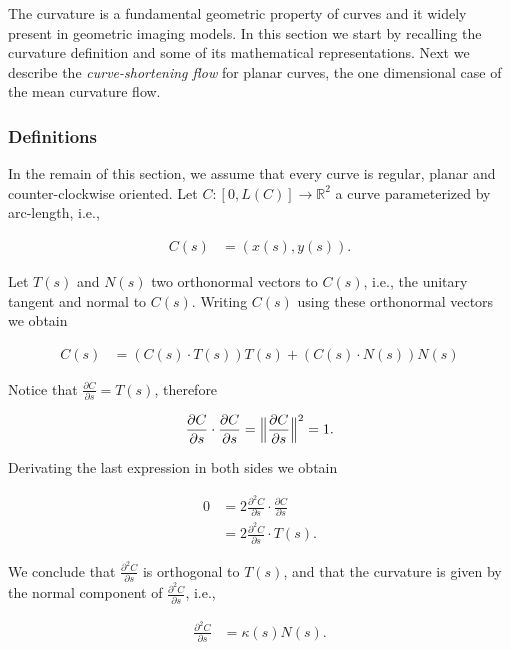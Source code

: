 The curvature is a fundamental geometric property of curves and it widely present in geometric imaging models. In this section we start by recalling the curvature definition and some of its mathematical representations. Next we describe the \emph{curve-shortening flow} for planar curves, the one dimensional case of the mean curvature flow.

\subsubsection{Definitions}
In the remain of this section, we assume that every curve is regular, planar and counter-clockwise oriented. Let $C:[0,L(C)]\rightarrow \mathbb{R}^2$ a curve parameterized by arc-length, i.e.,

\begin{align*}
	C(s) &= (x(s),y(s)).
\end{align*}

Let $T(s)$ and $N(s)$ two orthonormal vectors to $C(s)$, i.e., the unitary tangent and normal to $C(s)$. Writing $C(s)$ using these orthonormal vectors we obtain

\begin{align*}
	C(s) &= \left( C(s) \cdot T(s) \right)T(s) + \left( C(s) \cdot N(s) \right)N(s)
\end{align*}

Notice that $\frac{\partial C}{\partial s} = T(s)$, therefore

\begin{align*}
	\frac{\partial C}{\partial s} \cdot \frac{\partial C}{\partial s} = \Big\lVert \frac{ \partial C}{\partial s} \Big\rVert^2 = 1.
\end{align*}

Derivating the last expression in both sides we obtain

\begin{align*}
	0 &= 2\frac{\partial ^2 C}{\partial s} \cdot \frac{\partial C}{\partial s} \\
	  &= 2\frac{\partial ^2 C}{\partial s} \cdot T(s).
\end{align*}

We conclude that $\frac{\partial ^2 C}{\partial s}$ is orthogonal to $T(s)$, and that the curvature is given by the normal component of $\frac{\partial ^2 C}{\partial s}$, i.e.,

\begin{align*}
	\frac{\partial ^2 C}{\partial s} &= \kappa(s) N(s).
\end{align*}

